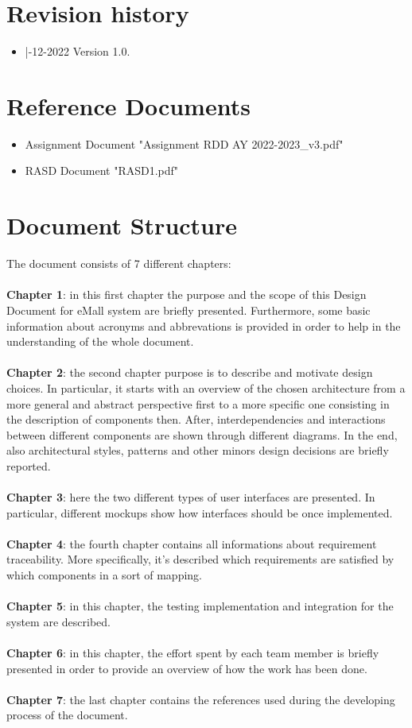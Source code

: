 \documentclass[a4paper]{report}
\begin{document}
\section{Revision history}
\begin{itemize}
\item |-12-2022 Version 1.0.
\end{itemize}
\section{Reference Documents}
\begin{itemize}
\item Assignment Document "Assignment RDD AY 2022-2023\_v3.pdf"
\item RASD Document "RASD1.pdf"
\end{itemize}
\section{Document Structure}

The document consists of 7 different chapters:
\\ 
\\
\textbf{Chapter 1}: in this first chapter the purpose and the scope of this Design Document for eMall system are briefly presented. Furthermore, some basic information about acronyms and abbrevations is provided in order to help in the understanding of the whole document.\\ \\
\textbf{Chapter 2}: the second chapter purpose is to describe and motivate design choices. In particular, it starts with an overview of the chosen architecture from a more general and abstract perspective first to a more specific one consisting in the description of components then. After, interdependencies and interactions between different components are shown through different diagrams. In the end, also architectural styles, patterns and other minors design decisions are briefly reported. \\ \\
\textbf{Chapter 3}: here the two different types of user interfaces are presented. In particular, different mockups show how interfaces should be once implemented.\\ \\
\textbf{Chapter 4}: the fourth chapter contains all informations about requirement traceability. More specifically, it's described which requirements are satisfied by which components in a sort of mapping.\\ \\
\textbf{Chapter 5}: in this chapter, the testing implementation and integration for the system are described.\\ \\
\textbf{Chapter 6}: in this chapter, the effort spent by each team member is briefly presented in order to provide an overview of how the work has been done.\\ \\
\textbf{Chapter 7}: the last chapter contains the references used during the developing process of the document.
\end{document}
